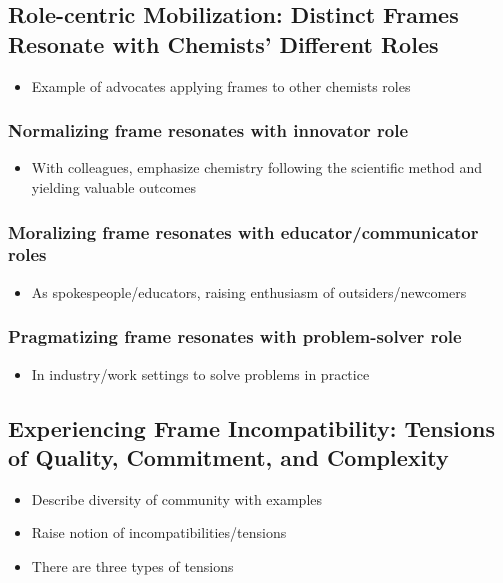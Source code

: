 \documentclass{article}
\begin{document}
	\subsection*{Role-centric Mobilization: Distinct Frames Resonate with Chemists’ Different Roles}
	\begin{itemize}
		\item Example of advocates applying frames to other chemists roles
	\end{itemize}
	
	\subsubsection*{Normalizing frame resonates with innovator role}
	\begin{itemize}
		\item With colleagues, emphasize chemistry following the scientific method and yielding valuable outcomes
	\end{itemize}
	
	\subsubsection*{Moralizing frame resonates with educator/communicator roles}
	\begin{itemize}
		\item As spokespeople/educators, raising enthusiasm of outsiders/newcomers
	\end{itemize}
	
	\subsubsection*{Pragmatizing frame resonates with problem-solver role}
	\begin{itemize}
		\item In industry/work settings to solve problems in practice
	\end{itemize}

	\subsection*{Experiencing Frame Incompatibility: Tensions of Quality, Commitment, and Complexity}
	\begin{itemize}
		\item Describe diversity of community with examples
		\item Raise notion of incompatibilities/tensions
		\item There are three types of tensions	
	\end{itemize}
\end{document}
